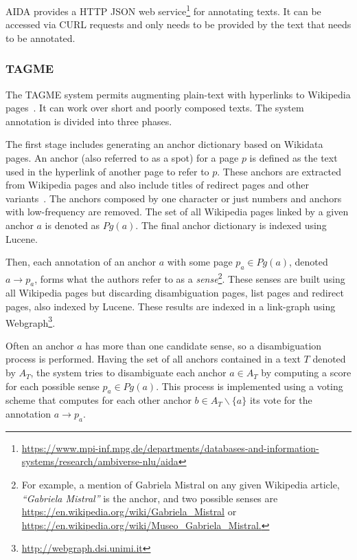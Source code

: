 AIDA provides a HTTP JSON web service\footnote{\url{https://www.mpi-inf.mpg.de/departments/databases-and-information-systems/research/ambiverse-nlu/aida}} 
for annotating texts. It can be accessed via CURL requests and only needs to be provided by the 
text that needs to be annotated.

\subsubsection{TAGME}
\label{cap2:theoFrame/infExtr/entityLinking/tagme}
The TAGME system permits augmenting plain-text with hyperlinks to Wikipedia 
pages~\cite{EL:tagme-FerraginaS10}. It can work over short and poorly composed texts. The system 
annotation is divided into three phases.

The first stage includes generating an anchor dictionary based on Wikidata pages. An anchor 
(also referred to as a spot) for a page $p$ is defined as the text used in the hyperlink of 
another page to refer to $p$. These anchors are extracted from Wikipedia pages and also include 
titles of redirect pages and other variants~\cite{entLib:Cucerzan07}. The anchors composed by 
one character or just numbers and anchors with low-frequency are removed. The set of all 
Wikipedia pages linked by a given anchor $a$ is denoted as $Pg(a)$. The final anchor dictionary 
is indexed using Lucene. 

Then, each annotation of an anchor $a$ with some page $p_a \in Pg(a)$, denoted 
$a \rightarrow p_a$, forms what the authors refer to as a \textit{sense}\footnote{For example, 
a mention of Gabriela Mistral on any given Wikipedia article, \textit{“Gabriela Mistral”} is the 
anchor, and two possible senses are \url{https://en.wikipedia.org/wiki/Gabriela\_Mistral} or 
\url{https://en.wikipedia.org/wiki/Museo\_Gabriela\_Mistral.}}. These senses are built using all 
Wikipedia pages but discarding disambiguation pages, list pages and redirect pages, also indexed 
by Lucene. These results are indexed in a link-graph using 
Webgraph\footnote{\url{http://webgraph.dsi.unimi.it}}.

Often an anchor $a$ has more than one candidate sense, so a disambiguation process is performed. 
Having the set of all anchors contained in a text $T$ denoted by $A_T$, the system tries to 
disambiguate each anchor $a \in A_T$ by computing a score for each possible sense 
$p_a \in Pg(a)$. This process is implemented using a voting scheme that computes for each other 
anchor $b \in A_T \backslash \{a\}$ its vote for the annotation $a \rightarrow p_a$.

